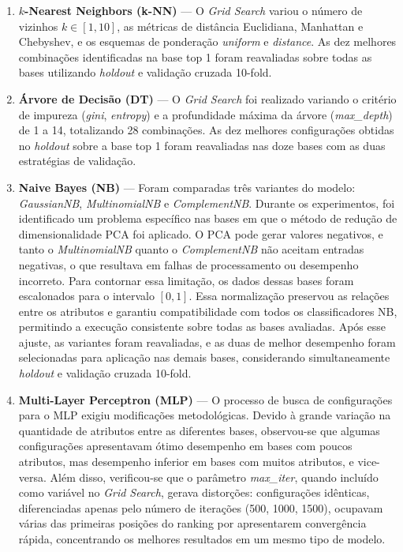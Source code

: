 \documentclass[12pt]{article}
\begin{document}
\begin{enumerate}
    \item \textbf{\(k\)-Nearest Neighbors (k-NN)} — O \textit{Grid Search} variou o número de vizinhos \(k \in [1,10]\), as métricas de distância Euclidiana, Manhattan e Chebyshev, e os esquemas de ponderação \textit{uniform} e \textit{distance}. As dez melhores combinações identificadas na base top 1 foram reavaliadas sobre todas as bases utilizando \textit{holdout} e validação cruzada 10-fold.

    \item \textbf{Árvore de Decisão (DT)} — O \textit{Grid Search} foi realizado variando o critério de impureza (\textit{gini}, \textit{entropy}) e a profundidade máxima da árvore (\textit{max\_depth}) de 1 a 14, totalizando 28 combinações. As dez melhores configurações obtidas no \textit{holdout} sobre a base top 1 foram reavaliadas nas doze bases com as duas estratégias de validação.

    \item \textbf{Naive Bayes (NB)} — Foram comparadas três variantes do modelo: \textit{GaussianNB}, \textit{MultinomialNB} e \textit{ComplementNB}.  
    Durante os experimentos, foi identificado um problema específico nas bases em que o método de redução de dimensionalidade PCA foi aplicado. O PCA pode gerar valores negativos, e tanto o \textit{MultinomialNB} quanto o \textit{ComplementNB} não aceitam entradas negativas, o que resultava em falhas de processamento ou desempenho incorreto.  
    Para contornar essa limitação, os dados dessas bases foram escalonados para o intervalo \([0,1]\). Essa normalização preservou as relações entre os atributos e garantiu compatibilidade com todos os classificadores NB, permitindo a execução consistente sobre todas as bases avaliadas.  
    Após esse ajuste, as variantes foram reavaliadas, e as duas de melhor desempenho foram selecionadas para aplicação nas demais bases, considerando simultaneamente \textit{holdout} e validação cruzada 10-fold.

    \item \textbf{Multi-Layer Perceptron (MLP)} — O processo de busca de configurações para o MLP exigiu modificações metodológicas.  
    Devido à grande variação na quantidade de atributos entre as diferentes bases, observou-se que algumas configurações apresentavam ótimo desempenho em bases com poucos atributos, mas desempenho inferior em bases com muitos atributos, e vice-versa.  
    Além disso, verificou-se que o parâmetro \textit{max\_iter}, quando incluído como variável no \textit{Grid Search}, gerava distorções: configurações idênticas, diferenciadas apenas pelo número de iterações (500, 1000, 1500), ocupavam várias das primeiras posições do ranking por apresentarem convergência rápida, concentrando os melhores resultados em um mesmo tipo de modelo.  


\end{enumerate}
\end{document}
